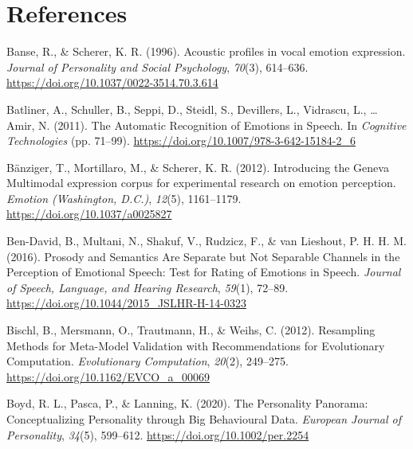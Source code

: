 \documentclass[
  english,
  man,floatsintext]{apa6}
\newlength{\cslhangindent}
\newenvironment{CSLReferences}[2] %
 {%
  \setlength{\parindent}{0pt}
  \ifodd #1 \everypar{\setlength{\hangindent}{\cslhangindent}}\ignorespaces\fi
  \ifnum #2 > 0
  \setlength{\parskip}{#2\baselineskip}
  \fi
 }%
 {}
\begin{document}
\newpage

\hypertarget{references}{%
\section{References}\label{references}}

\hypertarget{refs}{}
\begin{CSLReferences}{1}{0}
\leavevmode{}%
Banse, R., \& Scherer, K. R. (1996). Acoustic profiles in vocal emotion expression. \emph{Journal of Personality and Social Psychology}, \emph{70}(3), 614--636. \url{https://doi.org/10.1037/0022-3514.70.3.614}

\leavevmode{}%
Batliner, A., Schuller, B., Seppi, D., Steidl, S., Devillers, L., Vidrascu, L., \ldots{} Amir, N. (2011). The {Automatic Recognition} of {Emotions} in {Speech}. In \emph{Cognitive {Technologies}} (pp. 71--99). \url{https://doi.org/10.1007/978-3-642-15184-2_6}

\leavevmode{}%
Bänziger, T., Mortillaro, M., \& Scherer, K. R. (2012). Introducing the {Geneva Multimodal} expression corpus for experimental research on emotion perception. \emph{Emotion (Washington, D.C.)}, \emph{12}(5), 1161--1179. \url{https://doi.org/10.1037/a0025827}

\leavevmode{}%
Ben-David, B., Multani, N., Shakuf, V., Rudzicz, F., \& van Lieshout, P. H. H. M. (2016). Prosody and {Semantics Are Separate} but {Not Separable Channels} in the {Perception} of {Emotional Speech}: {Test} for {Rating} of {Emotions} in {Speech}. \emph{Journal of Speech, Language, and Hearing Research}, \emph{59}(1), 72--89. \url{https://doi.org/10.1044/2015_JSLHR-H-14-0323}

\leavevmode{}%
Bischl, B., Mersmann, O., Trautmann, H., \& Weihs, C. (2012). Resampling {Methods} for {Meta-Model Validation} with {Recommendations} for {Evolutionary Computation}. \emph{Evolutionary Computation}, \emph{20}(2), 249--275. \url{https://doi.org/10.1162/EVCO_a_00069}

\leavevmode{}%
Boyd, R. L., Pasca, P., \& Lanning, K. (2020). The {Personality Panorama}: {Conceptualizing Personality} through {Big Behavioural Data}. \emph{European Journal of Personality}, \emph{34}(5), 599--612. \url{https://doi.org/10.1002/per.2254}


\end{CSLReferences}
\end{document}
